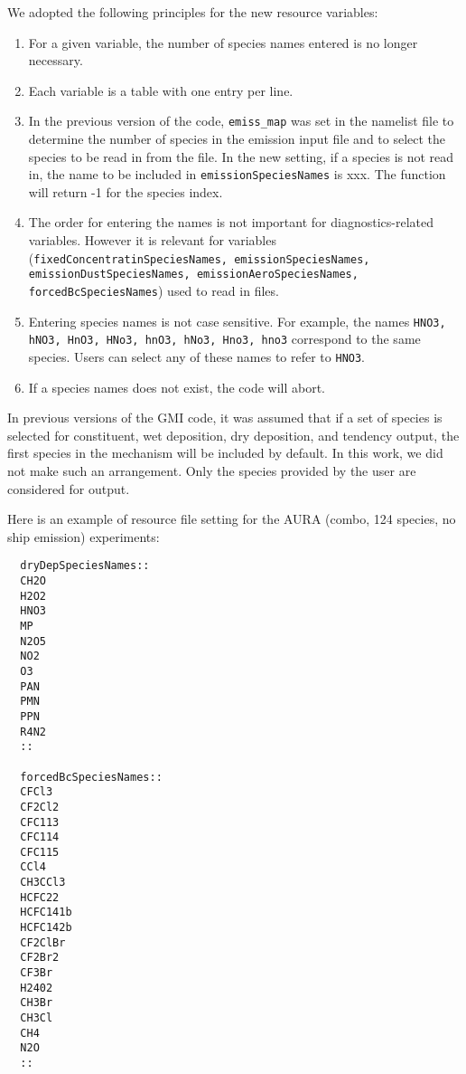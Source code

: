 We adopted the following principles for the new resource variables:
\begin{enumerate}
\item For a given variable, the number of species names entered is no longer necessary.
\item Each variable is a table with one entry per line.
\item In the previous version of the code, {\tt emiss\_map} was set in the
      namelist file to determine the number of species in the emission input
      file and to select the species to be read in from the file.
      In the new setting, if a species is not read in, the name to be
      included in {\tt emissionSpeciesNames} is xxx. The function will
      return -1 for the species index.
\item The order for entering the names is not important for diagnostics-related 
      variables. However it is relevant for variables
      ({\tt fixedConcentratinSpeciesNames, emission\-Species\-Names,
      emissionDustSpeciesNames, emissionAeroSpeciesNames,
      forced\-Bc\-Species\-Names}) used to read in files.
\item Entering species names is not case sensitive. For example, the names
     {\tt HNO3, hNO3, HnO3, HNo3, hnO3, hNo3, Hno3, hno3} correspond to the
     same species. Users can select any of these names to refer to {\tt HNO3}.
\item If a species names does not exist, the code will abort.
\end{enumerate}

\begin{remark}
In previous versions of the GMI code, it was assumed that if a set of
species is selected for constituent, wet deposition, dry deposition,
and tendency output, the first species in the mechanism will be included by
default. In this work, we did not make such an arrangement.
Only the species provided by the user are considered for output.
\end{remark}

Here is an example of resource file setting for the AURA (combo, 124 species, no ship emission)
 experiments:

{\small
\begin{verbatim}
  dryDepSpeciesNames::
  CH2O
  H2O2
  HNO3
  MP
  N2O5
  NO2
  O3
  PAN
  PMN
  PPN
  R4N2
  ::

  forcedBcSpeciesNames::
  CFCl3
  CF2Cl2
  CFC113
  CFC114
  CFC115
  CCl4
  CH3CCl3
  HCFC22
  HCFC141b
  HCFC142b
  CF2ClBr
  CF2Br2
  CF3Br
  H2402
  CH3Br
  CH3Cl
  CH4
  N2O
  ::
\end{verbatim}
}

